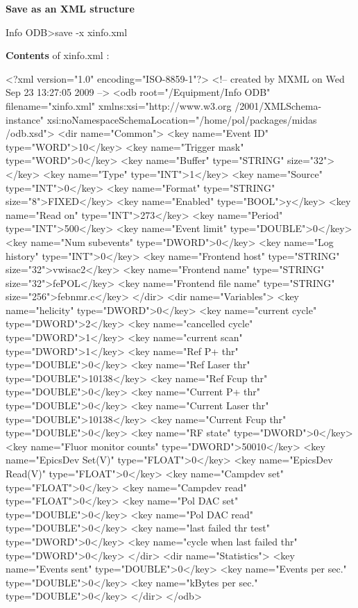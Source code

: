 {\bfseries  Save as an XML structure } 
\begin{DoxyCode}
Info ODB>save  -x xinfo.xml
\end{DoxyCode}
 {\bfseries Contents} of xinfo.xml : 
\begin{DoxyCode}
<?xml version="1.0" encoding="ISO-8859-1"?>
<!-- created by MXML on Wed Sep 23 13:27:05 2009 -->
<odb root="/Equipment/Info ODB" filename="xinfo.xml" xmlns:xsi="http://www.w3.org
      /2001/XMLSchema-instance" xsi:noNamespaceSchemaLocation="/home/pol/packages/midas
      /odb.xsd">
  <dir name="Common">
    <key name="Event ID" type="WORD">10</key>
    <key name="Trigger mask" type="WORD">0</key>
    <key name="Buffer" type="STRING" size="32"></key>
    <key name="Type" type="INT">1</key>
    <key name="Source" type="INT">0</key>
    <key name="Format" type="STRING" size="8">FIXED</key>
    <key name="Enabled" type="BOOL">y</key>
    <key name="Read on" type="INT">273</key>
    <key name="Period" type="INT">500</key>
    <key name="Event limit" type="DOUBLE">0</key>
    <key name="Num subevents" type="DWORD">0</key>
    <key name="Log history" type="INT">0</key>
    <key name="Frontend host" type="STRING" size="32">vwisac2</key>
    <key name="Frontend name" type="STRING" size="32">fePOL</key>
    <key name="Frontend file name" type="STRING" size="256">febnmr.c</key>
  </dir>
  <dir name="Variables">
    <key name="helicity" type="DWORD">0</key>
    <key name="current cycle" type="DWORD">2</key>
    <key name="cancelled cycle" type="DWORD">1</key>
    <key name="current scan" type="DWORD">1</key>
    <key name="Ref P+ thr" type="DOUBLE">0</key>
    <key name="Ref Laser thr" type="DOUBLE">10138</key>
    <key name="Ref Fcup thr" type="DOUBLE">0</key>
    <key name="Current P+ thr" type="DOUBLE">0</key>
    <key name="Current Laser thr" type="DOUBLE">10138</key>
    <key name="Current Fcup thr" type="DOUBLE">0</key>
    <key name="RF state" type="DWORD">0</key>
    <key name="Fluor monitor counts" type="DWORD">50010</key>
    <key name="EpicsDev Set(V)" type="FLOAT">0</key>
    <key name="EpicsDev Read(V)" type="FLOAT">0</key>
    <key name="Campdev set" type="FLOAT">0</key>
    <key name="Campdev read" type="FLOAT">0</key>
    <key name="Pol DAC set" type="DOUBLE">0</key>
    <key name="Pol DAC read" type="DOUBLE">0</key>
    <key name="last failed thr test" type="DWORD">0</key>
    <key name="cycle when last failed thr" type="DWORD">0</key>
  </dir>
  <dir name="Statistics">
    <key name="Events sent" type="DOUBLE">0</key>
    <key name="Events per sec." type="DOUBLE">0</key>
    <key name="kBytes per sec." type="DOUBLE">0</key>
  </dir>
</odb>
\end{DoxyCode}




